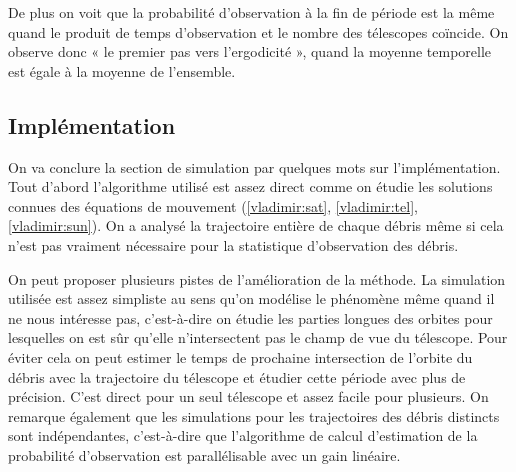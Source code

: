    De plus on voit que la probabilit\'e d'observation \`a la fin de p\'eriode
   est la m\^eme quand le produit de temps d'observation et le nombre des t\'elescopes
   coïncide. On observe donc « le premier pas vers l'ergodicit\'e », quand la moyenne 
   temporelle est \'egale \`a la moyenne de l'ensemble. 
   
   \subsection{Impl\'ementation}
On va conclure la section de simulation par quelques mots sur l'impl\'ementation.
Tout d'abord l'algorithme utilis\'e est assez direct comme on \'etudie les solutions 
connues des \'equations de mouvement (\ref{vladimir:sat}, \ref{vladimir:tel}, \ref{vladimir:sun}). On a analys\'e la trajectoire enti\`ere de chaque d\'ebris m\^eme si cela n'est pas vraiment 
n\'ecessaire pour la statistique d'observation des d\'ebris.

On peut proposer plusieurs pistes de l'am\'elioration de la m\'ethode. 
La simulation utilis\'ee est assez simpliste au sens qu'on mod\'elise le ph\'enom\`ene m\^eme quand il
 ne nous int\'eresse pas, c'est-\`a-dire on \'etudie les parties longues des orbites pour lesquelles on est sûr 
qu'elle n'intersectent pas le champ de vue du t\'elescope. Pour \'eviter cela on peut estimer le temps de prochaine
intersection de l'orbite du d\'ebris avec la trajectoire du t\'elescope et \'etudier cette p\'eriode avec plus de pr\'ecision. 
C'est direct pour un seul t\'elescope et assez facile pour plusieurs. On remarque \'egalement que les simulations
pour les trajectoires des d\'ebris distincts sont ind\'ependantes,
c'est-\`a-dire que l'algorithme de calcul d'estimation de la
probabilit\'e d'observation est parall\'elisable avec un gain lin\'eaire. 
   
   

